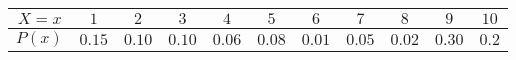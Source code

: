 \documentclass[prl,twocolumn,showpacs,preprintnumbers,superscriptaddress]{revtex4}
\theoremstyle{plain}
\theoremstyle{definition}
\begin{document}
\begin{widetext}
\begin{center}
\begin{tabular}{|c|c|c|c|c|c|c|c|c|c|c|}
\hline \Large$X = x$  & \Large$1$ & \Large$2$ &  \Large$3$  & \Large$4$ & \Large$5$ & \Large$6$ & \Large$7$ & \Large$8$ & \Large$9$ & \Large$10$\\
\hline \Large$P(x)$  & \Large$0.15$ & \Large$0.10$ &  \Large$0.10$ & \Large$0.06$ & \Large$0.08$ & \Large$0.01$ & \Large$0.05$ & \Large$0.02$ & \Large$0.30$ & \Large$0.2$\\
\hline
\end{tabular} 
\end{center}
\\
\\
\\


\end{widetext}
\end{document}
